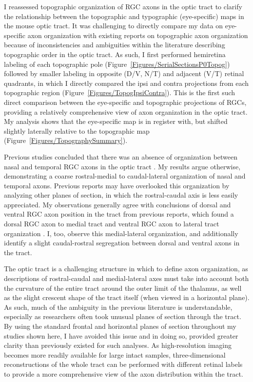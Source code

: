 \label{sec:TopogDiscuss}
I reassessed topographic organization of RGC axons in the optic tract to clarify the relationship between the topographic and typographic (eye-specific) maps in the mouse optic tract.
It was challenging to directly compare my data on eye-specific axon organization with existing reports on topographic axon organization because of inconsistencies and ambiguities within the literature describing topographic order in the optic tract.
As such, I first performed hemiretina labeling of each topographic pole (Figure~\ref{Figures/SerialSectionsP0Topog}) followed by smaller labeling in opposite (D/V, N/T) and adjacent (V/T) retinal quadrants, in which I directly compared the ipsi and contra projections from each topographic region (Figure~\ref{Figures/TopogIpsiContra}).
This is the first such direct comparison between the eye-specific and topographic projections of RGCs, providing a relatively comprehensive view of axon organization in the optic tract.
My analysis shows that the eye-specific map is in register with, but shifted slightly laterally relative to the topographic map (Figure~\ref{Figures/TopographySummary}).

Previous studies concluded that there was an absence of organization between nasal and temporal RGC axons in the optic tract \cite{reese1993reestablishment,chan1994changes,plas2005pretarget}.
My results argue otherwise, demonstrating a coarse rostral-medial to caudal-lateral organization of nasal and temporal axons.
Previous reports may have overlooked this organization by analyzing other planes of section, in which the rostral-caudal axis is less easily appreciated.
My observations generally agree with conclusions of dorsal and ventral RGC axon position in the tract from previous reports, which found a dorsal RGC axon to medial tract and ventral RGC axon to lateral tract organization \cite{torrealba1982studies,reh1983organization,reese1990fibre,reese1993reestablishment,chan1994changes,chan1999changes,plas2005pretarget}.
I, too, observe this medial-lateral organization, and additionally identify a slight caudal-rostral segregation between dorsal and ventral axons in the tract.

The optic tract is a challenging structure in which to define axon organization, as descriptions of rostral-caudal and medial-lateral axes must take into account both the curvature of the entire tract around the outer limit of the thalamus, as well as the slight crescent shape of the tract itself (when viewed in a horizontal plane).
As such, much of the ambiguity in the previous literature is understandable, especially as researchers often took unusual planes of section through the tract.
By using the standard frontal and horizontal planes of section throughout my studies shown here, I have avoided this issue and in doing so, provided greater clarity than previously existed for such analyses.
As high-resolution imaging becomes more readily available for large intact samples, three-dimensional reconstructions of the whole tract can be performed with different retinal labels to provide a more comprehensive view of the axon distribution within the tract.

